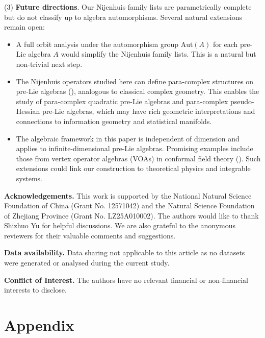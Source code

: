 \documentclass[12pt, reqno]{amsart}
\theoremstyle{plain}
\begin{document}
(3) \textbf{Future directions}. Our Nijenhuis family lists are parametrically complete but do not classify up to algebra automorphisms. Several natural extensions remain open:  
\begin{itemize}  
  \item A full orbit analysis under the automorphism group $\mathrm{Aut}(A)$ for each pre-Lie algebra $A$ would simplify the Nijenhuis family lists. This is a natural but non-trivial next step.  
  \item The Nijenhuis operators studied here can define para-complex structures on pre-Lie algebras (\cite{Wang}), analogous to classical complex geometry. This enables the study of para-complex quadratic pre-Lie algebras and para-complex pseudo-Hessian pre-Lie algebras, which may have rich geometric interpretations and connections to information geometry and statistical manifolds.  
  \item The algebraic framework in this paper is independent of dimension and applies to infinite-dimensional pre-Lie algebras. Promising examples include those from vertex operator algebras (VOAs) in conformal field theory (\cite[Subsection 2.6, 2.7]{Bai-in}). Such extensions could link our construction to theoretical physics and integrable systems.  
\end{itemize}
  


\textbf{Acknowledgements.}  This work is supported by the National Natural Science Foundation of China (Grant No. 12571042) and the Natural Science Foundation of Zhejiang Province (Grant No. LZ25A010002). The authors would like to thank Shizhuo Yu for
helpful discussions.  We are also grateful to the anonymous reviewers for their valuable comments and suggestions.

{\bf Data availability.} Data sharing not applicable to this article as no datasets were
generated or analysed during the current study.

{\bf Conflict of Interest.} The authors have no relevant financial or non-financial
interests to disclose.


\newpage










\section{Appendix}
\end{document}
